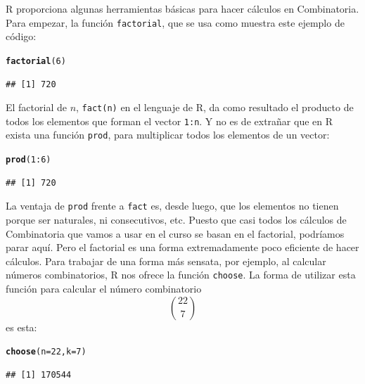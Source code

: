\documentclass[10pt,a4paper]{article}\usepackage[]{graphicx}\usepackage[]{color}
\makeatletter
\newcommand{\hlnum}[1]{\textcolor[rgb]{0.686,0.059,0.569}{#1}}%
\newcommand{\hlopt}[1]{\textcolor[rgb]{0,0,0}{#1}}%
\newcommand{\hlstd}[1]{\textcolor[rgb]{0.345,0.345,0.345}{#1}}%
\newcommand{\hlkwc}[1]{\textcolor[rgb]{0.333,0.667,0.333}{#1}}%
\newcommand{\hlkwd}[1]{\textcolor[rgb]{0.737,0.353,0.396}{\textbf{#1}}}%
\newenvironment{kframe}{%
 \def\at@end@of@kframe{}%
 \ifinner\ifhmode%
  \def\at@end@of@kframe{\end{minipage}}%
  \begin{minipage}{\columnwidth}%
 \fi\fi%
 \def\FrameCommand##1{\hskip\@totalleftmargin \hskip-\fboxsep
 \colorbox{shadecolor}{##1}\hskip-\fboxsep
     \hskip-\linewidth \hskip-\@totalleftmargin \hskip\columnwidth}%
 \MakeFramed {\advance\hsize-\width
   \@totalleftmargin\z@ \linewidth\hsize
   \@setminipage}}%
 {\par\unskip\endMakeFramed%
 \at@end@of@kframe}
\newenvironment{knitrout}{}{} %
\makeatother
\begin{document}
R proporciona algunas herramientas básicas para hacer cálculos en Combinatoria. Para empezar, la función {\tt factorial}, que se usa como muestra este ejemplo de código:
\begin{knitrout}
\color{fgcolor}\begin{kframe}
\begin{alltt}
\hlkwd{factorial}\hlstd{(}\hlnum{6}\hlstd{)}
\end{alltt}
\begin{verbatim}
## [1] 720
\end{verbatim}
\end{kframe}
\end{knitrout}
El factorial de $n$, {\tt fact(n)} en el lenguaje de R, da como resultado el producto de todos los elementos que forman el vector {\tt 1:n}. Y no es de extrañar que en R exista una función {\tt prod}, para multiplicar todos los elementos de un vector:
\begin{knitrout}
\color{fgcolor}\begin{kframe}
\begin{alltt}
\hlkwd{prod}\hlstd{(}\hlnum{1}\hlopt{:}\hlnum{6}\hlstd{)}
\end{alltt}
\begin{verbatim}
## [1] 720
\end{verbatim}
\end{kframe}
\end{knitrout}
La ventaja de {\tt prod} frente a {\tt fact} es, desde luego, que los elementos no tienen porque ser naturales, ni consecutivos, etc. Puesto que casi todos los cálculos de Combinatoria que vamos a usar en el curso se basan en el factorial, podríamos parar aquí. Pero el factorial es una forma extremadamente poco eficiente de hacer cálculos. Para trabajar de una forma más sensata, por ejemplo, al calcular números combinatorios, R nos ofrece la función {\tt choose}. La forma de utilizar esta función para  calcular el número combinatorio
\[\binom{22}{7}\]
es esta:
\begin{knitrout}
\color{fgcolor}\begin{kframe}
\begin{alltt}
\hlkwd{choose}\hlstd{(}\hlkwc{n}\hlstd{=}\hlnum{22}\hlstd{,}\hlkwc{k}\hlstd{=}\hlnum{7}\hlstd{)}
\end{alltt}
\begin{verbatim}
## [1] 170544
\end{verbatim}
\end{kframe}
\end{knitrout}
\end{document}
